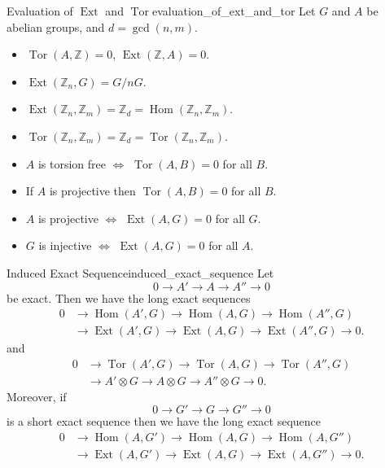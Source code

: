 \documentclass{article}
\begin{document}
\begin{theorem}{Evaluation of $\operatorname{Ext}$ and $\operatorname{Tor}$}{evaluation_of_ext_and_tor}
    Let $G$ and $A$ be abelian groups, and $d=\operatorname{gcd}(n,m)$.
    \begin{itemize}
        \item $\operatorname{Tor}(A,\mathbb{Z}) = 0$, $\operatorname{Ext}(\mathbb{Z},A) = 0$.
        \item $\operatorname{Ext}(\mathbb{Z}_n,G) = G/nG$.
        \item $\operatorname{Ext}(\mathbb{Z}_n,\mathbb{Z}_m) = \mathbb{Z}_d = \operatorname{Hom}(\mathbb{Z}_n,\mathbb{Z}_m)$.
        \item $\operatorname{Tor}(\mathbb{Z}_n,\mathbb{Z}_m) = \mathbb{Z}_d = \operatorname{Tor}(\mathbb{Z}_n,\mathbb{Z}_m)$.
        \item $A$ is torsion free $\Leftrightarrow$ $\operatorname{Tor}(A,B) = 0$ for all $B$.
        \item If $A$ is projective then $\operatorname{Tor}(A,B) = 0$ for all $B$.
        \item $A$ is projective $\Leftrightarrow$ $\operatorname{Ext}(A,G) = 0$ for all $G$.
        \item $G$ is injective $\Leftrightarrow$ $\operatorname{Ext}(A,G) = 0$ for all $A$.
    \end{itemize}
\end{theorem}

\begin{theorem}{Induced Exact Sequence}{induced_exact_sequence}
    Let
    \[ 0 \rightarrow A' \rightarrow A \rightarrow A'' \rightarrow 0 \]
    be exact.
    Then we have the long exact sequences
    \begin{align*}
        0 &\rightarrow \operatorname{Hom}(A',G) \rightarrow \operatorname{Hom}(A,G) \rightarrow \operatorname{Hom}(A'',G) \\
        &\rightarrow \operatorname{Ext}(A',G) \rightarrow \operatorname{Ext}(A,G) \rightarrow \operatorname{Ext}(A'',G) \rightarrow 0.
    \end{align*}
    and
    \begin{align*}
        0 &\rightarrow \operatorname{Tor}(A',G) \rightarrow \operatorname{Tor}(A,G) \rightarrow \operatorname{Tor}(A'',G) \\
        &\rightarrow A'\otimes G \rightarrow A\otimes G \rightarrow A''\otimes G\rightarrow 0.
    \end{align*}
    Moreover, if
    \[ 0\rightarrow G' \rightarrow G \rightarrow G'' \rightarrow 0 \]
    is a short exact sequence then we have the long exact sequence
    \begin{align*}
        0 &\rightarrow \operatorname{Hom}(A,G') \rightarrow \operatorname{Hom}(A,G) \rightarrow \operatorname{Hom}(A,G'') \\
        &\rightarrow \operatorname{Ext}(A,G') \rightarrow \operatorname{Ext}(A,G) \rightarrow \operatorname{Ext}(A,G'')\rightarrow 0.
    \end{align*}
\end{theorem}
\end{document}
